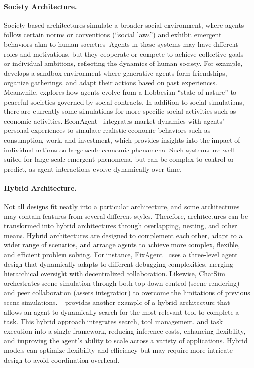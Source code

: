 \paragraph{Society Architecture.} Society-based architectures simulate a broader social environment, where agents follow certain norms or conventions (``social laws'') and exhibit emergent behaviors akin to human societies. Agents in these systems may have different roles and motivations, but they cooperate or compete to achieve collective goals or individual ambitions, reflecting the dynamics of human society. For example, \cite{stanf_villege} develops a sandbox environment where generative agents form friendships, organize gatherings, and adapt their actions based on past experiences. Meanwhile, \cite{sct_society} explores how agents evolve from a Hobbesian ``state of nature'' to peaceful societies governed by social contracts. In addition to social simulations, there are currently some simulations for more specific social activities such as economic activities. EconAgent~\cite{econagent} integrates market dynamics with agents' personal experiences to simulate realistic economic behaviors such as consumption, work, and investment, which provides insights into the impact of individual actions on large-scale economic phenomena. Such systems are well-suited for large-scale emergent phenomena, but can be complex to control or predict, as agent interactions evolve dynamically over time.

\paragraph{Hybrid Architecture.} Not all designs fit neatly into a particular architecture, and some architectures may contain features from several different styles. Therefore, architectures can be transformed into hybrid architectures through overlapping, nesting, and other means. Hybrid architectures are designed to complement each other, adapt to a wider range of scenarios, and arrange agents to achieve more complex, flexible, and efficient problem solving. For instance, FixAgent~\cite{fixagent_mas_for_debug} uses a three-level agent design that dynamically adapts to different debugging complexities, merging hierarchical oversight with decentralized collaboration. Likewise, ChatSim~\cite{chatsim_mas_make_scene} orchestrates scene simulation through both top-down control (scene rendering) and peer collaboration (assets integration) to overcome the limitations of previous scene simulations. ~\cite{mas_use_tool} provides another example of a hybrid architecture that allows an agent to dynamically search for the most relevant tool to complete a task. This hybrid approach integrates search, tool management, and task execution into a single framework, reducing inference costs, enhancing flexibility, and improving the agent's ability to scale across a variety of applications. Hybrid models can optimize flexibility and efficiency but may require more intricate design to avoid coordination overhead.

